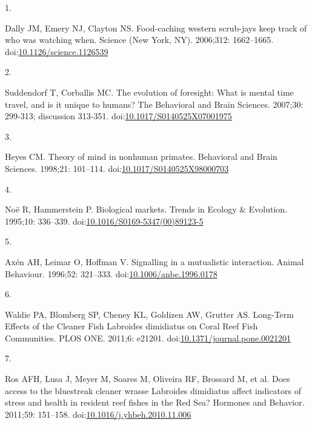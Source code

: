 \documentclass[10pt,letterpaper]{article}
\newlength{\cslhangindent}
\newlength{\csllabelwidth}
\newlength{\cslentryspacingunit} %
\newenvironment{CSLReferences}[2] %
 {%
  \setlength{\parindent}{0pt}
  \ifodd #1
  \let\oldpar\par
  \def\par{\hangindent=\cslhangindent\oldpar}
  \fi
  \setlength{\parskip}{#2\cslentryspacingunit}
 }%
 {}
\newcommand{\CSLLeftMargin}[1]{\parbox[t]{\csllabelwidth}{#1}}
\newcommand{\CSLRightInline}[1]{\parbox[t]{\linewidth - \csllabelwidth}{#1}\break}
\begin{document}
\hypertarget{refs}{}
\begin{CSLReferences}{0}{0}
\leavevmode{}%
\CSLLeftMargin{1. }
\CSLRightInline{Dally JM, Emery NJ, Clayton NS. Food-caching western
scrub-jays keep track of who was watching when. Science (New York, NY).
2006;312: 1662--1665.
doi:\href{https://doi.org/10.1126/science.1126539}{10.1126/science.1126539}}

\leavevmode{}%
\CSLLeftMargin{2. }
\CSLRightInline{Suddendorf T, Corballis MC. The evolution of foresight:
{What} is mental time travel, and is it unique to humans? The Behavioral
and Brain Sciences. 2007;30: 299-313; discussion 313-351.
doi:\href{https://doi.org/10.1017/S0140525X07001975}{10.1017/S0140525X07001975}}

\leavevmode{}%
\CSLLeftMargin{3. }
\CSLRightInline{Heyes CM. Theory of mind in nonhuman primates.
Behavioral and Brain Sciences. 1998;21: 101--114.
doi:\href{https://doi.org/10.1017/S0140525X98000703}{10.1017/S0140525X98000703}}

\leavevmode{}%
\CSLLeftMargin{4. }
\CSLRightInline{Noë R, Hammerstein P. Biological markets. Trends in
Ecology \& Evolution. 1995;10: 336--339.
doi:\href{https://doi.org/10.1016/S0169-5347(00)89123-5}{10.1016/S0169-5347(00)89123-5}}

\leavevmode{}%
\CSLLeftMargin{5. }
\CSLRightInline{Axén AH, Leimar O, Hoffman V. Signalling in a
mutualistic interaction. Animal Behaviour. 1996;52: 321--333.
doi:\href{https://doi.org/10.1006/anbe.1996.0178}{10.1006/anbe.1996.0178}}

\leavevmode{}%
\CSLLeftMargin{6. }
\CSLRightInline{Waldie PA, Blomberg SP, Cheney KL, Goldizen AW, Grutter
AS. Long-{Term} {Effects} of the {Cleaner} {Fish} {Labroides} dimidiatus
on {Coral} {Reef} {Fish} {Communities}. PLOS ONE. 2011;6: e21201.
doi:\href{https://doi.org/10.1371/journal.pone.0021201}{10.1371/journal.pone.0021201}}

\leavevmode{}%
\CSLLeftMargin{7. }
\CSLRightInline{Ros AFH, Lusa J, Meyer M, Soares M, Oliveira RF,
Brossard M, et al. Does access to the bluestreak cleaner wrasse
{Labroides} dimidiatus affect indicators of stress and health in
resident reef fishes in the {Red} {Sea}? Hormones and Behavior. 2011;59:
151--158.
doi:\href{https://doi.org/10.1016/j.yhbeh.2010.11.006}{10.1016/j.yhbeh.2010.11.006}}


\end{CSLReferences}
\end{document}
